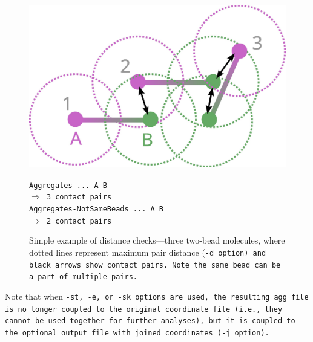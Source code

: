 \begin{figure}
  \centering
  \begin{minipage}{0.45\textwidth}
    \includegraphics[scale=0.6]{AggregateCheck.jpg}
  \end{minipage}
  \begin{minipage}{0.5\textwidth}
    \tt{Aggregates ... A B}\\
    \-\hspace{30pt}$\Rightarrow$ 3 contact pairs\\
    \tt{Aggregates-NotSameBeads ... A B}\\
    \-\hspace{30pt}$\Rightarrow$ 2 contact pairs\\
  \end{minipage}
  \caption{
    Simple example of distance checks---three two-bead molecules, where dotted
    lines represent maximum pair distance (\tt{-d} option) and black arrows show
    contact pairs. Note the same bead can be a part of multiple pairs.
  }
  \label{fig:AggCheck}
\end{figure}

Note that when \tt{-st}, \tt{-e}, or \tt{-sk} options are used, the resulting
\tt{agg} file is no longer coupled to the original coordinate file (i.e., they
cannot be used together for further analyses), but it is coupled to the optional
output file with joined coordinates (\tt{-j} option).

